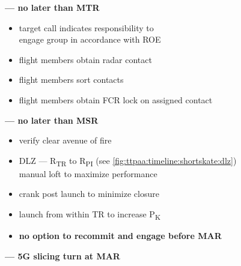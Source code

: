 \begin{checklistenumerate}[start=0]
    \blueitem[Target] \textbf{--- no later than MTR}
    \label{subsec:ttpaa:timeline:shortskate:target}
    \begin{itemize}
        \item target call indicates responsibility to \\
        engage group in accordance with ROE
        \item flight members obtain radar contact
    \end{itemize}

    \blueitem[Sort]
    \label{subsec:ttpaa:timeline:shortskate:sort}
    \begin{itemize}
        \item flight members sort contacts
        \item flight members obtain FCR lock on assigned contact
    \end{itemize}

     \textbf{--- no later than MSR}
    \label{subsec:ttpaa:timeline:shortskate:shoot}
    \begin{itemize} 
        \item verify clear avenue of fire
        \item DLZ --- R\textsubscript{TR} to R\textsubscript{PI} 
        \hfill (see \cref{fig:ttpaa:timeline:shortskate:dlz})\\
        manual loft to maximize performance
        \item crank post launch to minimize closure
        \item launch from within TR to increase P\textsubscript{K}
        \item \textbf{no option to recommit and engage before MAR}
    \end{itemize}
    
    \blueitem[Abort]%
    \label{subsec:ttpaa:timeline:shortskate:abort}
    \textbf{--- 5G slicing turn at MAR}
\end{checklistenumerate}

\marginfigrestore